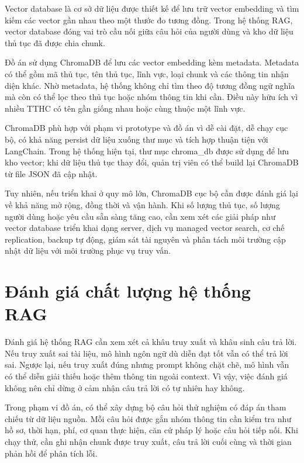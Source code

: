 Vector database là cơ sở dữ liệu được thiết kế để lưu trữ vector
embedding và tìm kiếm các vector gần nhau theo một thước đo tương đồng.
Trong hệ thống RAG, vector database đóng vai trò cầu nối giữa câu hỏi
của người dùng và kho dữ liệu thủ tục đã được chia chunk.

Đồ án sử dụng ChromaDB để lưu các vector embedding kèm metadata.
Metadata có thể gồm mã thủ tục, tên thủ tục, lĩnh vực, loại chunk và các
thông tin nhận diện khác. Nhờ metadata, hệ thống không chỉ tìm theo độ
tương đồng ngữ nghĩa mà còn có thể lọc theo thủ tục hoặc nhóm thông tin
khi cần. Điều này hữu ích vì nhiều TTHC có tên gần giống nhau hoặc cùng
thuộc một lĩnh vực.

ChromaDB phù hợp với phạm vi prototype và đồ án vì dễ cài đặt, dễ chạy
cục bộ, có khả năng persist dữ liệu xuống thư mục và tích hợp thuận tiện
với LangChain. Trong hệ thống hiện tại, thư mục chroma\_db được sử dụng
để lưu kho vector; khi dữ liệu thủ tục thay đổi, quản trị viên có thể
build lại ChromaDB từ file JSON đã cập nhật.

Tuy nhiên, nếu triển khai ở quy mô lớn, ChromaDB cục bộ cần được đánh
giá lại về khả năng mở rộng, đồng thời và vận hành. Khi số lượng thủ
tục, số lượng người dùng hoặc yêu cầu sẵn sàng tăng cao, cần xem xét các
giải pháp như vector database triển khai dạng server, dịch vụ managed
vector search, cơ chế replication, backup tự động, giám sát tài nguyên
và phân tách môi trường cập nhật dữ liệu với môi trường phục vụ truy
vấn.

\section{Đánh giá chất lượng hệ thống
RAG}

Đánh giá hệ thống RAG cần xem xét cả khâu truy xuất và khâu sinh câu trả
lời. Nếu truy xuất sai tài liệu, mô hình ngôn ngữ dù diễn đạt tốt vẫn có
thể trả lời sai. Ngược lại, nếu truy xuất đúng nhưng prompt không chặt
chẽ, mô hình vẫn có thể diễn giải thiếu hoặc thêm thông tin ngoài
context. Vì vậy, việc đánh giá không nên chỉ dừng ở cảm nhận câu trả lời
có tự nhiên hay không.

Trong phạm vi đồ án, có thể xây dựng bộ câu hỏi thử nghiệm có đáp án
tham chiếu từ dữ liệu nguồn. Mỗi câu hỏi được gắn nhóm thông tin cần
kiểm tra như hồ sơ, thời hạn, phí, cơ quan thực hiện, căn cứ pháp lý
hoặc câu hỏi tiếp nối. Khi chạy thử, cần ghi nhận chunk được truy xuất,
câu trả lời cuối cùng và thời gian phản hồi để phân tích lỗi.

